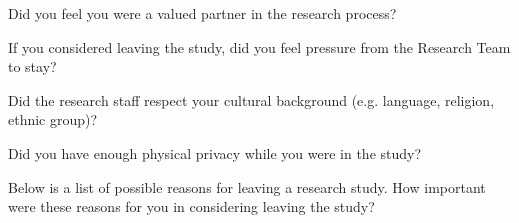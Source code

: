 \documentclass[english,pagemark,stamp,oneside,print_questionnaire_id]{sdapsclassic}
\begin{document}
\begin{questionnaire}
\begin{Form}
                        \begin{optionquestion}[singlechoice,cols=1]{Did you feel you were a valued partner in the research process?}\end{optionquestion}
                        \begin{optionquestion}[singlechoice,cols=1]{If you considered leaving the study, did you feel pressure from the Research Team to stay?}\end{optionquestion}
                        \begin{optionquestion}[singlechoice,cols=1]{Did the research staff respect your cultural background (e.g. language, religion, ethnic group)?}\end{optionquestion}
                        \begin{optionquestion}[singlechoice,cols=1]{Did you have enough physical privacy while you were in the study?}\end{optionquestion}
                           \begin{optiongroup}{Below is a list of possible reasons for leaving a research study. How important were these reasons for you in considering leaving the study?}
                        
                            
                            
                            
                            
                    
                    
                    

\end{optiongroup}
\end{Form}
\end{questionnaire}
\end{document}
